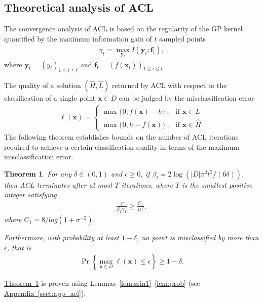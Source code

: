 \documentclass{article}
\def\*#1{\bm{#1}}
\newcommand{\theoremref}[1]{\hyperref[#1]{\mbox{Theorem~\ref*{#1}}}}
\newcommand{\appref}[1]{\hyperref[#1]{\mbox{Appendix~\ref*{#1}}}}
\newcommand{\twopartdef}[4]
{
	\left\{
		\begin{array}{ll}
			#1\,,& \mbox{if } #2 \\
			#3\,,& \mbox{if } #4
		\end{array}
	\right.
}
\newtheorem{theorem}{Theorem}
\newcommand{\acl}{\textsf{ACL}\xspace}
\begin{document}
\subsection{Theoretical analysis of \acl}
The convergence analysis of \acl is based on the regularity of the GP kernel
quantified by the maximum information gain of $t$ sampled points
\begin{align*}
\gamma_t = \max_{\*y_t}I(\*y_t; \*f_t),
\end{align*}
where $\*y_t = (y_i)_{1\leq i\leq t}$ and
$\*f_t = (f(\*x_i))_{1\leq i\leq t}$.

The quality of a solution $(\hat{H}, \hat{L})$ returned by \acl with
respect to the classification of a single point $\*x \in D$ can be
judged by the misclassification error
\begin{align*}
\ell(\*x) = \twopartdef{\max\{0, f(\*x) - h\}}{\*x\in \hat{L}}{\max\{0, h - f(\*x)\}}{\*x\in \hat{H}}
\end{align*}
The following theorem establishes bounds on the number of \acl iterations
required to achieve a certain classification quality in terms of the
maximum misclassification error.

\begin{theorem}
\label{thm:acl}
For any $\delta \in (0, 1)$ and $\epsilon \geq 0$,
if $\beta_t = 2\log(|D|\pi^2 t^2/(6\delta))$, then \acl terminates after
at most $T$ iterations, where $T$ is the smallest positive integer
satisfying
\begin{align*}
\frac{T}{\beta_T \gamma_T} \geq \frac{C_1}{4\epsilon^2},
\end{align*}
where $C_1 = 8/log(1 + \sigma^{-2})$.

Furthermore, with probability at least $1-\delta$, no point is
misclassified by more than $\epsilon$, that is
\begin{align*}
\Pr\left\{\max_{\*x\in D}\ell(\*x) \leq \epsilon\right\} \geq 1 - \delta.
\end{align*}
\end{theorem}

\theoremref{thm:acl} is proven using
Lemmas~\ref{lem:srin1}--\ref{lem:prob} (see \appref{sect:app_acl}).
\end{document}
